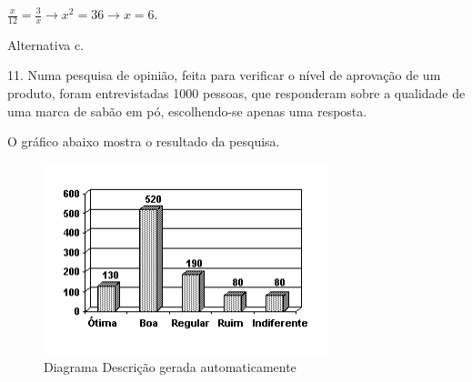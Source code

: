 \begin{escolha}
\begin{boxmedio}
\begin{boxmedio}
{\begin{boxpeq}
\begin{boxpeq}
{\begin{boxpeq}
\begin{boxmedio}
\begin{boxmedio}
\begin{boxpeq}
\begin{boxmedio}
\begin{boxpeq}
\begin{boxpeq}
\begin{boxpeq}
\begin{boxpeq}
\begin{boxmedio}
{\begin{boxmedio}
\begin{boxmedio}
\begin{boxpeq}
\begin{boxmedio}
\begin{boxpeq}
\begin{boxpeq}
\begin{boxpeq}
\begin{escolha}
{\begin{boxmedio}
\begin{boxpeq}
\begin{boxpeq}
\begin{boxpeq}
\begin{boxpeq}
\begin{boxpeq}
\begin{boxmedio}
\begin{boxpeq}
\begin{boxpeq}
\begin{boxpeq}
{\begin{boxpeq}
\begin{boxmedio}
\begin{boxpeq}
\begin{boxpeq}
\begin{boxpeq}
{\begin{boxpeq}
\begin{boxmedio}
{\begin{boxpeq}
\begin{boxpeq}
\begin{boxmedio}
\begin{boxmedio}
\begin{boxpeq}
\begin{boxpeq}
{\begin{boxpeq}
\begin{boxpeq}
\begin{boxpeq}
\begin{boxpeq}
\begin{boxpeq}
\begin{escolha}
\begin{escolha}
{\begin{boxmedio}
\begin{boxpeq}
\begin{q°}
\begin{boxmedio}
\begin{boxpeq}
\begin{boxpeq}
\begin{boxmedio}
\begin{boxmedio}
\begin{boxmedio}
\begin{boxmedio}
{\begin{escolha}
\begin{escolha}
\begin{escolha}
\begin{escolha}
\begin{escolha}
\begin{escolha}
{$\frac{x}{12} = \frac{3}{x} \rightarrow x^{2} = 36 \rightarrow x = 6$.

Alternativa c.

11. Numa pesquisa de opinião, feita para verificar o nível de aprovação
de um produto, foram entrevistadas 1000 pessoas, que responderam sobre a
qualidade de uma marca de sabão em pó, escolhendo-se apenas uma
resposta.

O gráfico abaixo mostra o resultado da pesquisa.

\begin{figure}
\centering
\includegraphics[width=3.25in,height=2.18333in]{./_SAEB_9_MAT/media/image279.png}
\caption{Diagrama Descrição gerada automaticamente}

\end{figure}}
\end{escolha}
\end{escolha}
\end{escolha}
\end{escolha}
\end{escolha}
\end{escolha}}
\end{boxmedio}
\end{boxmedio}
\end{boxmedio}
\end{boxmedio}
\end{boxpeq}
\end{boxpeq}
\end{boxmedio}
\end{q°}
\end{boxpeq}
\end{boxmedio}}
\end{escolha}
\end{escolha}
\end{boxpeq}
\end{boxpeq}
\end{boxpeq}
\end{boxpeq}
\end{boxpeq}}
\end{boxpeq}
\end{boxpeq}
\end{boxmedio}
\end{boxmedio}
\end{boxpeq}
\end{boxpeq}}
\end{boxmedio}
\end{boxpeq}}
\end{boxpeq}
\end{boxpeq}
\end{boxpeq}
\end{boxmedio}
\end{boxpeq}}
\end{boxpeq}
\end{boxpeq}
\end{boxpeq}
\end{boxmedio}
\end{boxpeq}
\end{boxpeq}
\end{boxpeq}
\end{boxpeq}
\end{boxpeq}
\end{boxmedio}}
\end{escolha}
\end{boxpeq}
\end{boxpeq}
\end{boxpeq}
\end{boxmedio}
\end{boxpeq}
\end{boxmedio}
\end{boxmedio}}
\end{boxmedio}
\end{boxpeq}
\end{boxpeq}
\end{boxpeq}
\end{boxpeq}
\end{boxmedio}
\end{boxpeq}
\end{boxmedio}
\end{boxmedio}
\end{boxpeq}}
\end{boxpeq}
\end{boxpeq}}
\end{boxmedio}
\end{boxmedio}
\end{escolha}
